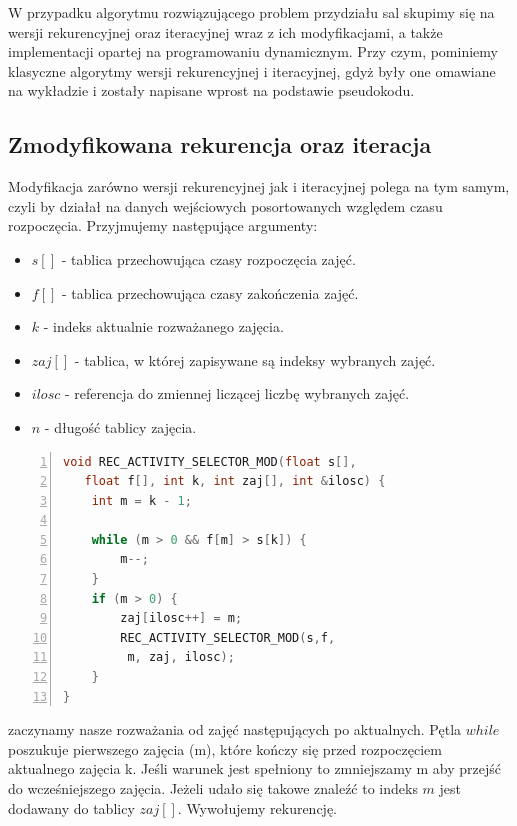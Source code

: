 \documentclass{article}
\begin{document}
\large{W przypadku algorytmu rozwiązującego problem przydziału sal skupimy się na wersji rekurencyjnej oraz iteracyjnej wraz z ich modyfikacjami, a także implementacji opartej na programowaniu dynamicznym. Przy czym, pominiemy klasyczne algorytmy wersji rekurencyjnej i iteracyjnej, gdyż były one omawiane na wykładzie i zostały napisane wprost na podstawie pseudokodu.}

\subsection{Zmodyfikowana rekurencja oraz iteracja}

\large{Modyfikacja zarówno wersji rekurencyjnej jak i iteracyjnej polega na tym samym, czyli by działał na danych wejściowych posortowanych względem czasu rozpoczęcia. Przyjmujemy następujące argumenty:}

\begin{itemize}
	\item $s[]$ - tablica przechowująca czasy rozpoczęcia zajęć.
	\item $f[]$ - tablica przechowująca czasy zakończenia zajęć.
	\item $k$ - indeks aktualnie rozważanego zajęcia.
	\item $zaj[]$ - tablica, w której zapisywane są indeksy wybranych zajęć.
	\item $ilosc$ - referencja do zmiennej liczącej liczbę wybranych zajęć.
	\item $n$ - długość tablicy zajęcia.
\end{itemize}

\begin{lstlisting}[language=C++, caption={Kod funkcji rozwiazywania problemu przydziału sal w wersji zmodyfikowanej rekurencji}, numbers=left, frame=single, xleftmargin=20pt]
void REC_ACTIVITY_SELECTOR_MOD(float s[], 
   float f[], int k, int zaj[], int &ilosc) {
	int m = k - 1;
	
	while (m > 0 && f[m] > s[k]) {
		m--;
	}
	if (m > 0) {
		zaj[ilosc++] = m;
		REC_ACTIVITY_SELECTOR_MOD(s,f,
		 m, zaj, ilosc);
	}
}
\end{lstlisting}

\large{zaczynamy nasze rozważania od zajęć następujących po aktualnych. Pętla $while$ poszukuje pierwszego zajęcia (m), które kończy się przed rozpoczęciem aktualnego zajęcia k. Jeśli warunek jest spełniony to zmniejszamy m aby przejść do wcześniejszego zajęcia. Jeżeli udało się takowe znaleźć to indeks $m$ jest dodawany do tablicy $zaj[]$. Wywołujemy rekurencję.}
\end{document}
